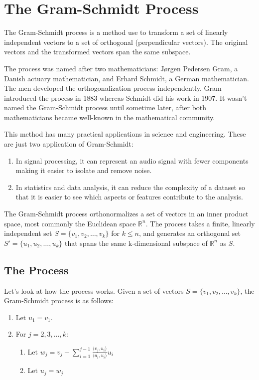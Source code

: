 \chapter{The Gram-Schmidt Process}

The Gram-Schmidt process is a method use to transform a set of linearly independent vectors to a set of orthogonal (perpendicular vectors). The original vectors and the transformed vectors span the same subspace. 

The process was named after two mathematicians: Jørgen Pedersen Gram, a Danish actuary mathematician, and Erhard Schmidt, a German mathematician. The men developed the orthogonalization process independently. Gram introduced the process in 1883 whereas Schmidt did his work in 1907.  It wasn’t named the Gram-Schmidt process until sometime later, after both mathematicians became well-known in the mathematical community.

This method has many practical applications in science and engineering. These are just two application of Gram-Schmidt:
\begin{enumerate}
\item In signal processing, it can represent an audio signal with fewer components making it easier to isolate and remove noise. 
\item In statistics and data analysis, it can reduce the complexity of a dataset so that it is easier to see which aspects or features contribute to the analysis. 
\end{enumerate}

The Gram-Schmidt process orthonormalizes a set of vectors in an inner product space, most commonly the Euclidean space
$\mathbb{R}^n$. The process takes a finite, linearly independent set
$S = \{v_1, v_2, \ldots, v_k\}$ for $k \leq n$, and generates an
orthogonal set $S' = \{u_1, u_2, \ldots, u_k\}$ that spans the same
k-dimensional subspace of $\mathbb{R}^n$ as $S$.

\section{The Process}

Let's look at how the process works. Given a set of vectors $S = \{v_1, v_2, \ldots, v_k\}$, the Gram-Schmidt process is as follows:

\begin{enumerate}
    \item Let $u_1 = v_1$.
    \item For $j = 2, 3, \ldots, k$:
    \begin{enumerate}
        \item Let $w_j = v_j - \sum_{i=1}^{j-1} \frac{\langle v_j, u_i \rangle}{\langle u_i, u_i \rangle} u_i$
        \item Let $u_j = w_j$
    \end{enumerate}
\end{enumerate}


